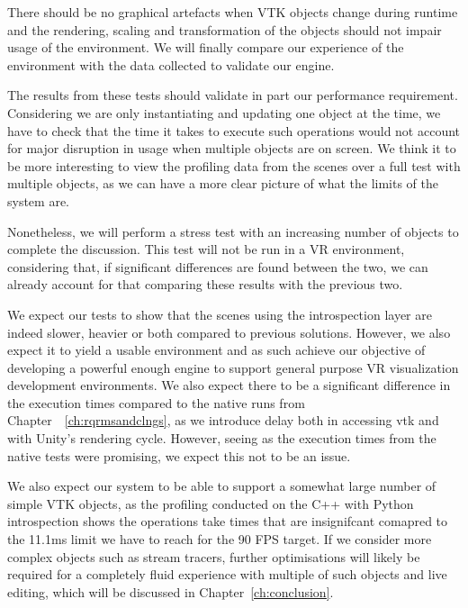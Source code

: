 There should be no graphical artefacts when VTK objects change during runtime and the rendering, scaling and transformation of the objects should not impair usage of the environment. We will finally compare our experience of the environment with the data collected to validate our engine.

The results from these tests should validate in part our performance requirement. Considering we are only instantiating and updating one object at the time, we have to check that the time it takes to execute such operations would not account for major disruption in usage when multiple objects are on screen. We think it to be more interesting to view the profiling data from the scenes over a full test with multiple objects, as we can have a more clear picture of what the limits of the system are.

Nonetheless, we will perform a stress test with an increasing number of objects to complete the discussion. This test will not be run in a VR environment, considering that, if significant differences are found between the two, we can already account for that comparing these results with the previous two.


We expect our tests to show that the scenes using the introspection layer are indeed slower, heavier or both compared to previous solutions. However, we also expect it to yield a usable environment and as such achieve our objective of developing a powerful enough engine to support general purpose VR visualization development environments. We also expect there to be a significant difference in the execution times compared to the native runs from Chapter~~\ref{ch:rqrmsandclngs}, as we introduce delay both in accessing \acrshort{vtk} and with Unity's rendering cycle. However, seeing as the execution times from the native tests were promising, we expect this not to be an issue.

We also expect our system to be able to support a somewhat large number of simple VTK objects, as the profiling conducted on the C++ with Python introspection shows the operations take times that are insignifcant comapred to the 11.1ms limit we have to reach for the 90 FPS target. If we consider more complex objects such as stream tracers, further optimisations will likely be required for a completely fluid experience with multiple of such objects and live editing, which will be discussed in Chapter~\ref{ch:conclusion}.

